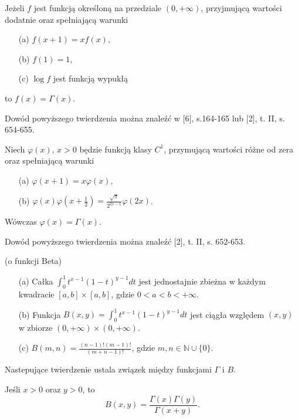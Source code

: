 \documentclass[leqno]{article}
\begin{document}
\begin{justify}
\begin{theorem}
{
    Jeżeli $f$ jest funkcją określoną na przedziale $(0, +\infty)$, przyjmującą wartości dodatnie oraz spełniającą warunki
    \begin{itemize}
        \item [(a)] $f(x+1) = xf(x)$,
        \item [(b)] $f(1) = 1$,
        \item [(c)] $\log f$ jest funkcją wypukłą
    \end{itemize}
    to $f(x) = \Gamma(x)$.
}
\end{theorem}

Dowód powyższego twierdzenia można znaleźć w [6], s.164-165 lub [2], t. II, s. 654-655.

\begin{theorem}
{
    Niech $\varphi(x)$, $x > 0$ będzie funkcją klasy $C^1$, przymującą wartości różne od zera oraz spełniającą warunki 
    \begin{itemize}
        \item [(a)] $\varphi(x + 1) = x\varphi(x)$,
        \item [(b)] $\varphi(x)\varphi(x + \frac{1}{2}) = \frac{\sqrt \pi}{2^{2x-1}}\varphi(2x)$.
    \end{itemize}
    Wówczas $\varphi(x) = \Gamma(x)$.
}
\end{theorem}

Dowód powyższego twierdzenia można znaleźć [2], t. II, s. 652-653.

\begin{theorem}
{
    (o funkcji Beta)
    \begin{itemize}
        \item [(a)]
            Całka $\int_{0}^{1}t^{x-1}{(1-t)}^{y-1}dt$ jest jednostajnie zbieżna w każdym kwadracie $[a,b] \times [a,b]$, gdzie $0 < a < b < +\infty$.
        \item [(b)]
            Funkcja $B(x,y) = \int_{0}^{1}t^{x-1}{(1-t)}^{y-1}dt$ jest ciągła względem $(x,y)$ w zbiorze $(0, +\infty) \times (0, +\infty)$.
        \item [(c)]
            $B(m,n) = \frac{(n-1)!(m-1)!}{(m+n-1)!}$, gdzie $m,n \in \mathbb{N} \cup \{0\}$.
    \end{itemize}
}
\end{theorem}

Nastepujące twierdzenie ustala związek między funkcjami $\Gamma$ i $B$. 

\begin{theorem}
{
    Jeśli $x > 0$ oraz $y > 0$, to
    \[
        B(x,y) = \frac{\Gamma(x) \Gamma(y)}{\Gamma(x + y)}.
    \]
}
\end{theorem}


\end{justify}
\end{document}
